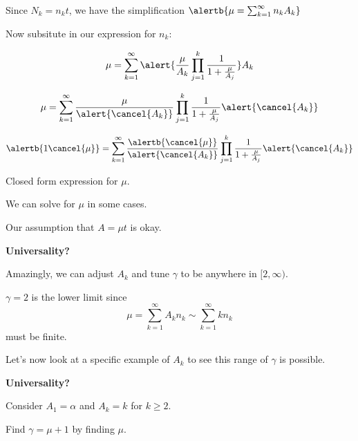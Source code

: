 \begin{frame}[label=]
\begin{frame}[label=]
\begin{frame}[label=]
\begin{frame}[label=]
\begin{frame}[label=]
\begin{frame}[label=]
\begin{frame}[label=]
\begin{frame}[label=]
\begin{frame}[label=]
\begin{frame}[label=]
\begin{frame}[label=]
\begin{frame}[label=]
\begin{frame}[label=]
\begin{frame}[label=]
\begin{frame}[label=]
\begin{frame}[label=]
\begin{frame}[label=]
\begin{frame}[label=]
\begin{frame}[label=]
\begin{frame}[label=]
\begin{frame}[label=]
\begin{frame}[label=]
\begin{frame}[label=]
\begin{frame}[label=]
\begin{overprint}
    Since $N_k = n_k t$, we have the simplification
    $
    \alertb{
    \mu = \sum_{k=1}^{\infty} n_k A_k}
    $
  
    Now subsitute in our expression for $n_k$:
          
    $$
    \mu = 
    \sum_{k=1}^{\infty} 
    \alert{
      \frac{\mu}{A_k}
      \prod_{j=1}^{k}
      \frac{1}{1 + \frac{\mu}{A_j}}
    }
    A_k
    $$
    
    $$
    \mu = 
    \sum_{k=1}^{\infty} 
    \frac{\mu}{\alert{\cancel{A_k}}}
    \prod_{j=1}^{k}
    \frac{1}{1 + \frac{\mu}{A_j}}
    \alert{\cancel{A_k}}
    $$
          
    $$
    \alertb{1 \cancel{\mu}} = 
    \sum_{k=1}^{\infty} 
    \frac{\alertb{\cancel{\mu}}}{\alert{\cancel{A_k}}}
    \prod_{j=1}^{k}
    \frac{1}{1 + \frac{\mu}{A_j}}
    \alert{\cancel{A_k}}
    $$
        
      Closed form expression for $\mu$.
    
      We can solve for $\mu$ in some cases.
    
      Our assumption that $A = \mu t$ is okay.
  


  \textbf{Universality?}

  
  
    Amazingly, we can adjust $A_k$ and tune $\gamma$
    to be anywhere in $[2,\infty)$.
  
    $\gamma = 2$ is the lower limit since
    $$
    \mu = 
    \sum_{k=1}^{\infty} A_k n_k 
    \sim
    \sum_{k=1}^{\infty} k n_k
    $$
    must be finite.
  
    Let's now look at a specific example of $A_k$
    to see this range of $\gamma$ is possible.
  

  \textbf{Universality?}

  
  
    Consider $A_1 = \alpha$ and $A_k = k$ for $k \ge 2$.
   
    Find $\gamma = \mu + 1$ by finding $\mu$.
  

\end{overprint}
\end{frame}
\end{frame}
\end{frame}
\end{frame}
\end{frame}
\end{frame}
\end{frame}
\end{frame}
\end{frame}
\end{frame}
\end{frame}
\end{frame}
\end{frame}
\end{frame}
\end{frame}
\end{frame}
\end{frame}
\end{frame}
\end{frame}
\end{frame}
\end{frame}
\end{frame}
\end{frame}
\end{frame}
